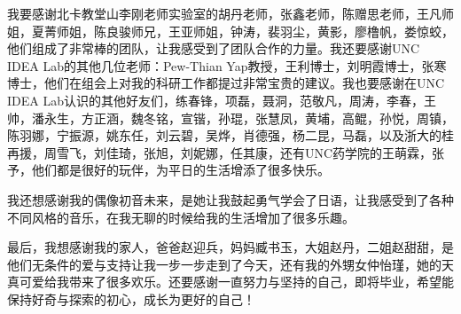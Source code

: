 我要感谢北卡教堂山李刚老师实验室的胡丹老师，张鑫老师，陈赠思老师，王凡师姐，夏菁师姐，陈良骏师兄，王亚师姐，钟涛，裴羽尘，黄影，廖橹帆，娄惊蛟，他们组成了非常棒的团队，让我感受到了团队合作的力量。我还要感谢UNC IDEA Lab的其他几位老师：Pew-Thian Yap教授，王利博士，刘明霞博士，张寒博士，他们在组会上对我的科研工作都提过非常宝贵的建议。我也要感谢在UNC IDEA Lab认识的其他好友们，练春锋，项磊，聂洞，范敬凡，周涛，李春，王帅，潘永生，方正涵，魏冬铭，宣锴，孙琨，张慧凤，黄埔，高鲲，孙悦，周镇，陈羽娜，宁振源，姚东任，刘云碧，吴烨，肖德强，杨二昆，马磊，以及浙大的桂再援，周雪飞，刘佳琦，张旭，刘妮娜，任其康，还有UNC药学院的王萌霖，张予，他们都是很好的玩伴，为平日的生活增添了很多快乐。

我还想感谢我的偶像初音未来，是她让我鼓起勇气学会了日语，让我感受到了各种不同风格的音乐，在我无聊的时候给我的生活增加了很多乐趣。

最后，我想感谢我的家人，爸爸赵迎兵，妈妈臧书玉，大姐赵丹，二姐赵甜甜，是他们无条件的爱与支持让我一步一步走到了今天，还有我的外甥女仲怡瑾，她的天真可爱给我带来了很多欢乐。还要感谢一直努力与坚持的自己，即将毕业，希望能保持好奇与探索的初心，成长为更好的自己！

